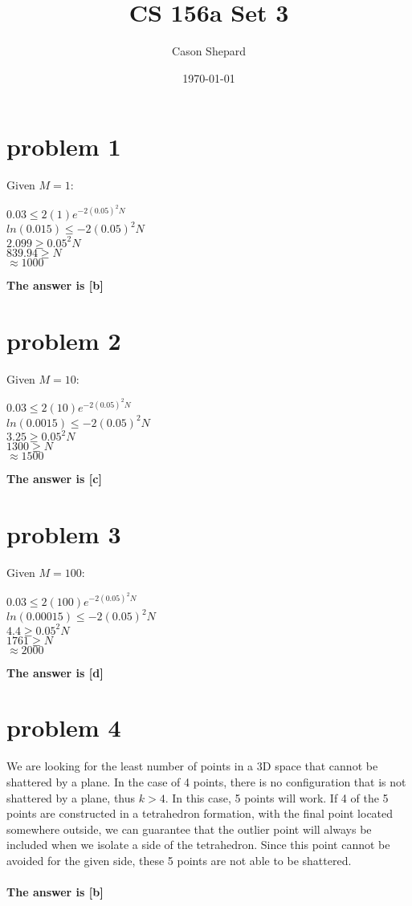 \documentclass{article}
\title{CS 156a Set 3}
\author{Cason Shepard}
\date\today
\begin{document}
\maketitle

\section*{problem 1}
Given $M = 1$:
\begin{center}
    $0.03 \leq 2(1)e^{-2(0.05)^2N}$\\
    $ln(0.015) \leq -2(0.05)^2N$\\
    $2.099 \geq 0.05^2N$\\
    $839.94 \geq N$\\
    $\approx 1000$
\end{center}
\textbf{The answer is [b]}

\section*{problem 2}
Given $M = 10$:
\begin{center}
    $0.03 \leq 2(10)e^{-2(0.05)^2N}$\\
    $ln(0.0015) \leq -2(0.05)^2N$\\
    $3.25 \geq 0.05^2N$\\
    $1300 \geq N$\\
    $\approx 1500$
\end{center}
\textbf{The answer is [c]}

\section*{problem 3}
Given $M = 100$:
\begin{center}
    $0.03 \leq 2(100)e^{-2(0.05)^2N}$\\
    $ln(0.00015) \leq -2(0.05)^2N$\\
    $4.4 \geq 0.05^2N$\\
    $1761 \geq N$\\
    $\approx 2000$
\end{center}
\textbf{The answer is [d]}

\section*{problem 4}
We are looking for the least number of points in a 3D space that cannot be shattered by a plane. In the case of 4 points, there is no configuration that is not shattered by a plane, thus $k > 4$. In this case, 5 points will work. If 4 of the 5 points are constructed in a tetrahedron formation, with the final point located somewhere outside, we can guarantee that the outlier point will always be included when we isolate a side of the tetrahedron. Since this point cannot be avoided for the given side, these 5 points are not able to be shattered. \\\\
\textbf{The answer is [b]}
\end{document}
